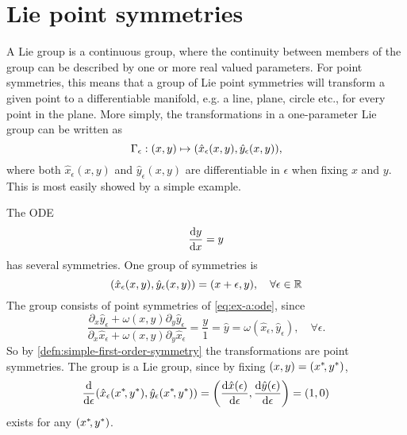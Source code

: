 \section{Lie point symmetries}

A Lie group is a continuous group, where the continuity between members of the group can be described by one or more real valued parameters.
For point symmetries, this means that a group of Lie point symmetries will transform a given point to a differentiable manifold, e.g. a line, plane, circle etc., for every point in the plane.
More simply, the transformations in a one-parameter Lie group can be written as
\begin{equation}
  \Gamma_\epsilon: \pqty{x,y} \mapsto \pqty{\hat{x}_\epsilon(x,y), \hat{y}_\epsilon(x,y)},
\end{equation}
where both \(\hat{x}_\epsilon(x,y)\) and \(\hat{y}_\epsilon(x,y)\) are differentiable in \(\epsilon\) when fixing \(x\) and \(y\).
This is most easily showed by a simple example.
\begin{exmp}
  The ODE
  \begin{equation} \label{eq:ex-a:ode}
    \dv{y}{x} = y
  \end{equation}
  has several symmetries.
  One group of symmetries is
  \begin{equation} \label{eq:ex-a:transformation}
    \pqty{\hat{x}_\epsilon(x,y), \hat{y}_\epsilon(x,y)} = \pqty{x + \epsilon, y}, \quad
    \forall \epsilon \in \reals
  \end{equation}
  The group consists of point symmetries of \cref{eq:ex-a:ode}, since
  \begin{equation}
    \frac{\partial_x \hat{y}_\epsilon + \omega(x,y) \partial_y \hat{y}_\epsilon}{\partial_x \hat{x}_\epsilon + \omega(x,y) \partial_y \hat{x}_\epsilon} =
    \frac{y}{1} =
    \hat{y} =
    \omega(\hat{x}_\epsilon,\hat{y}_\epsilon), \quad
    \forall \epsilon.
  \end{equation}
  So by \cref{defn:simple-first-order-symmetry} the transformations are point symmetries.
  The group is a Lie group, since by fixing \(\pqty{x,y}=\pqty{x^*\!,y^*}\),
  \begin{equation}
    \dv{\epsilon} \pqty{\hat{x}_\epsilon(x^*\!,y^*), \hat{y}_\epsilon(x^*\!,y^*)} =
    \pqty{\dv{\hat{x}(\epsilon)}{\epsilon}, \dv{\hat{y}(\epsilon)}{\epsilon}} =
    \pqty{1,0}
  \end{equation}
  exists for any \(\pqty{x^*\!,y^*}\).
\end{exmp}
